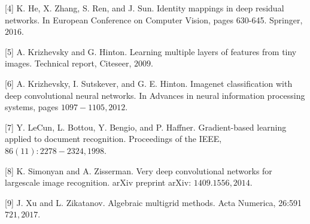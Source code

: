 \documentclass[10pt]{article}
\begin{document}
[4] K. He, X. Zhang, S. Ren, and J. Sun. Identity mappings in deep residual networks. In European Conference on Computer Vision, pages 630-645. Springer, $2016 .$

[5] A. Krizhevsky and G. Hinton. Learning multiple layers of features from tiny images. Technical report, Citeseer, $2009 .$

[6] A. Krizhevsky, I. Sutskever, and G. E. Hinton. Imagenet classification with deep convolutional neural networks. In Advances in neural information processing systems, pages $1097-1105,2012$.

[7] Y. LeCun, L. Bottou, Y. Bengio, and P. Haffner. Gradient-based learning applied to document recognition. Proceedings of the IEEE, $86(11): 2278-2324,1998 .$

[8] K. Simonyan and A. Zisserman. Very deep convolutional networks for largescale image recognition. arXiv preprint arXiv: $1409.1556,2014 .$

[9] J. Xu and L. Zikatanov. Algebraic multigrid methods. Acta Numerica, 26:591$721,2017 .$
\end{document}
